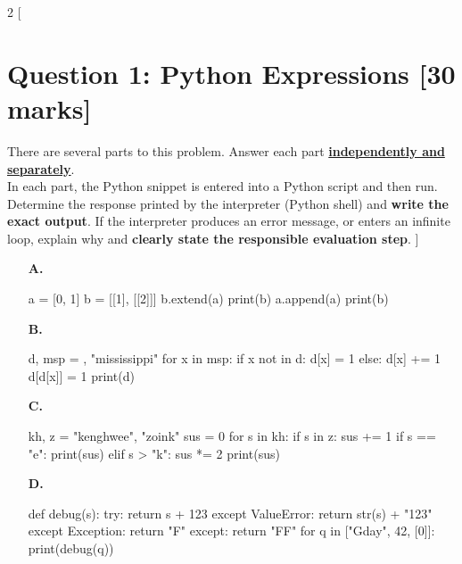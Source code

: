 \begin{multicols*}{2}
[
\section{Question 1: Python Expressions [30 marks]}
There are several parts to this problem. Answer each part \underline{\textbf{independently and separately}}. \\
In each part, the Python snippet is entered into a Python script and then run. Determine the
response printed by the interpreter (Python shell) and \textbf{write the exact output}. 
If the interpreter produces an error message, or enters an infinite loop, explain why and
\textbf{clearly state the responsible evaluation step}.
]
\begin{enumerate}
\item[\textbf{A.}] 
\begin{python}
a = [0, 1]
b = [[1], [[2]]]
b.extend(a)
print(b)
a.append(a)
print(b)
\end{python}
\begin{flushright}
    [5 marks]
\end{flushright}

\item[\textbf{B.}]
\begin{python}
d, msp = {}, "mississippi"
for x in msp:
    if x not in d:
        d[x] = 1
    else:
        d[x] += 1
        d[d[x]] = 1
print(d)
\end{python}
\begin{flushright}
    [5 marks]
\end{flushright}

\item[\textbf{C.}]
\begin{python}
kh, z = "kenghwee", "zoink"
sus = 0
for s in kh:
    if s in z:
        sus += 1
    if s == "e":
        print(sus)
    elif s > "k":
        sus *= 2
print(sus)
\end{python}
\begin{flushright}
    [5 marks]
\end{flushright}

\item[\textbf{D.}]
\begin{python}
def debug(s):
    try:
        return s + 123
    except ValueError:
        return str(s) + "123"
    except Exception:
        return "F"
    except:
        return "FF"
for q in ["Gday", 42, [0]]:
    print(debug(q))
\end{python}
\begin{flushright}
    [5 marks]
\end{flushright}


\end{enumerate}
\end{multicols*}
